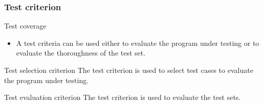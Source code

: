 \begin{frame}[hasprev=true, hasnext=false]
\frametitle{Test criterion}

\begin{block:fact}{Test coverage}
\begin{itemize}
	\item A test criteria can be used either to evaluate the program under
	testing or to evaluate the thoroughness of the test set.
\end{itemize}
\end{block:fact}

\begin{block:concept}{Test selection criterion}
The test criterion is used to select test cases to evaluate the program under
testing.
\end{block:concept}


\begin{block:concept}{Test evaluation criterion}
The test criterion is used to evaluate the test sets.
\end{block:concept}
\end{frame}



